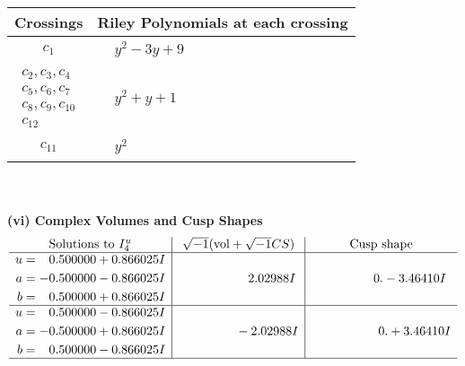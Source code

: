 \documentclass[1p]{elsarticle_modified}
\theoremstyle{definition}
\newcommand{\I}{\sqrt{-1}}
\begin{document}
\begin{tabular}{m{50pt}|m{274pt}}
Crossings & \hspace{64pt}Riley Polynomials at each crossing \\
\hline $$\begin{aligned}c_{1}\end{aligned}$$&$\begin{aligned}
&y^2-3 y+9
\end{aligned}$\\
\hline $$\begin{aligned}c_{2},c_{3},c_{4}\\c_{5},c_{6},c_{7}\\c_{8},c_{9},c_{10}\\c_{12}\end{aligned}$$&$\begin{aligned}
&y^2+y+1
\end{aligned}$\\
\hline $$\begin{aligned}c_{11}\end{aligned}$$&$\begin{aligned}
&y^2
\end{aligned}$\\
\hline
\end{tabular}\\~\\
\newpage\flushleft \textbf{(vi) Complex Volumes and Cusp Shapes}
$$\begin{array}{c|c|c}  
\text{Solutions to }I^u_{4}& \I (\text{vol} + \sqrt{-1}CS) & \text{Cusp shape}\\
 \hline 
\begin{aligned}
u &= \phantom{-}0.500000 + 0.866025 I \\
a &= -0.500000 - 0.866025 I \\
b &= \phantom{-}0.500000 + 0.866025 I\end{aligned}
 & \phantom{-0.000000 -}2.02988 I & \phantom{-0.000000 } 0. - 3.46410 I \\ \hline\begin{aligned}
u &= \phantom{-}0.500000 - 0.866025 I \\
a &= -0.500000 + 0.866025 I \\
b &= \phantom{-}0.500000 - 0.866025 I\end{aligned}
 & \phantom{-0.000000 } -2.02988 I & \phantom{-0.000000 -}0. + 3.46410 I\\
 \hline 
 \end{array}$$\newpage
\newpage\renewcommand{\arraystretch}{1}
\end{document}
